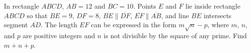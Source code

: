 In rectangle $ABCD$, $AB=12$ and $BC=10$. Points $E$ and $F$ lie inside rectangle $ABCD$ so that $BE=9$, $DF=8$, $\overline{BE}\parallel\overline{DF}$, $\overline{EF}\parallel\overline{AB}$, and line $BE$ intersects segment $\overline{AD}$. The length $EF$ can be expressed in the form $m\sqrt{n}-p$, where $m$, $n$, and $p$ are positive integers and $n$ is not divisible by the square of any prime. Find $m+n+p$.